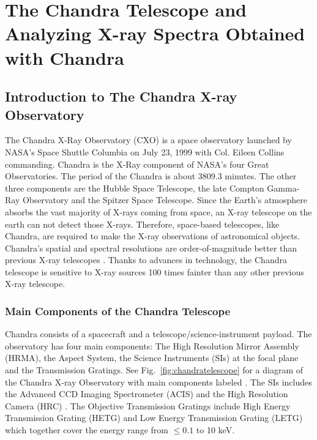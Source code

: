\chapter{The Chandra Telescope and Analyzing X-ray Spectra Obtained with Chandra}
\section{Introduction to The Chandra X-ray Observatory}
The Chandra X-Ray Observatory (CXO) is a space observatory launched by NASA's Space Shuttle Columbia on July 23, 1999 with Col. Eileen Collins commanding. Chandra is the X-Ray component of NASA's four Great Observatories. The period of the Chandra is about 3809.3 minutes. The other three components are the Hubble Space Telescope, the late Compton Gamma-Ray Observatory and the Spitzer Space Telescope. Since the Earth's atmosphere absorbs the vast majority of X-rays coming from space, an X-ray telescope on the earth can not detect those X-rays. Therefore, space-based telescopes, like Chandra, are required to make the X-ray observations of astronomical objects. Chandra's spatial and spectral resolutions are order-of-magnitude better than previous X-ray telescopes \citep{ChandraMSFC}. Thanks to advances in technology, the Chandra telescope is sensitive to X-ray sources 100 times fainter than any other previous X-ray telescope.  \par

\subsection{Main Components of the Chandra Telescope}
Chandra consists of a spacecraft and a telescope/science-instrument payload. The observatory has four main components: The High Resolution Mirror Assembly (HRMA), the Aspect System, the Science Instruments (SIs) at the focal plane and the Transmission Gratings. See Fig.~\ref{fig:chandratelescope} for a diagram of the Chandra X-ray Observatory with main components labeled \citep{Harbaugh2017}. The SIs includes the Advanced CCD Imaging Spectrometer (ACIS) \citep{canizares2003} and the High Resolution Camera (HRC) . The Objective Transmission Gratings include High Energy Transmission Grating (HETG) \citep{Canizares2000} and Low Energy Transmission Grating (LETG) \citep{Brinkman2000} which together cover the energy range from $\leq 0.1$ to 10 keV.\par 

